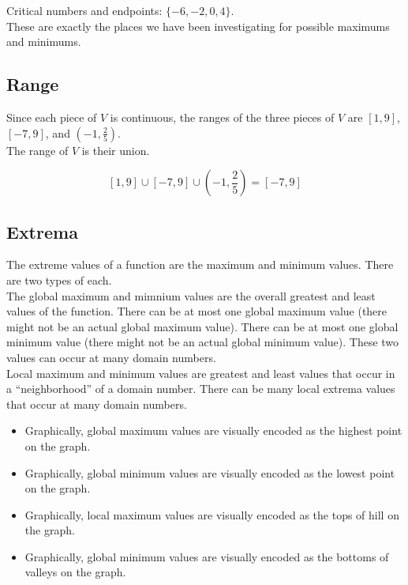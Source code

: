 \documentclass{ximera}
\begin{document}
Critical numbers and endpoints: $\{ -6, -2, 0, 4 \}$. \\

These are exactly the places we have been investigating for possible maximums and minimums.






\subsection*{Range} 


Since each piece of $V$ is continuous, the ranges of the three pieces of $V$ are $[1, 9]$, $[-7, 9]$, and $\left( -1, \frac{2}{5} \right)$. \\

The range of $V$ is their union.

\[
[1, 9] \cup [-7, 9] \cup \left( -1, \frac{2}{5} \right) = [-7, 9]
\]













\subsection*{Extrema}


The extreme values of a function are the maximum and minimum values.  There are two types of each. \\

The global maximum and mimnium values are the overall greatest and least values of the function.  There can be at most one global maximum value (there might not be an actual global maximum value). There can be at most one global minimum value (there might not be an actual global minimum value).  These two values can occur at many domain numbers.\\


Local maximum and minimum values are greatest and least values that occur in a ``neighborhood'' of a domain number.  There can be many local extrema values that occur at many domain numbers. \\


\begin{itemize}
\item Graphically, global maximum values are visually encoded as the highest point on the graph.
\item Graphically, global minimum values are visually encoded as the lowest point on the graph.
\item Graphically, local maximum values are visually encoded as the tops of hill on the graph.
\item Graphically, global minimum values are visually encoded as the bottoms of valleys on the graph.
\end{itemize}
\end{document}
